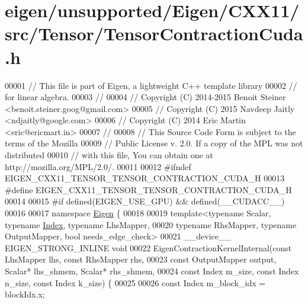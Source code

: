 \hypertarget{eigen_2unsupported_2_eigen_2_c_x_x11_2src_2_tensor_2_tensor_contraction_cuda_8h_source}{}\section{eigen/unsupported/\+Eigen/\+C\+X\+X11/src/\+Tensor/\+Tensor\+Contraction\+Cuda.h}
\label{eigen_2unsupported_2_eigen_2_c_x_x11_2src_2_tensor_2_tensor_contraction_cuda_8h_source}

\begin{DoxyCode}
00001 \textcolor{comment}{// This file is part of Eigen, a lightweight C++ template library}
00002 \textcolor{comment}{// for linear algebra.}
00003 \textcolor{comment}{//}
00004 \textcolor{comment}{// Copyright (C) 2014-2015 Benoit Steiner <benoit.steiner.goog@gmail.com>}
00005 \textcolor{comment}{// Copyright (C) 2015 Navdeep Jaitly <ndjaitly@google.com>}
00006 \textcolor{comment}{// Copyright (C) 2014 Eric Martin <eric@ericmart.in>}
00007 \textcolor{comment}{//}
00008 \textcolor{comment}{// This Source Code Form is subject to the terms of the Mozilla}
00009 \textcolor{comment}{// Public License v. 2.0. If a copy of the MPL was not distributed}
00010 \textcolor{comment}{// with this file, You can obtain one at http://mozilla.org/MPL/2.0/.}
00011 
00012 \textcolor{preprocessor}{#ifndef EIGEN\_CXX11\_TENSOR\_TENSOR\_CONTRACTION\_CUDA\_H}
00013 \textcolor{preprocessor}{#define EIGEN\_CXX11\_TENSOR\_TENSOR\_CONTRACTION\_CUDA\_H}
00014 
00015 \textcolor{preprocessor}{#if defined(EIGEN\_USE\_GPU) && defined(\_\_CUDACC\_\_)}
00016 
00017 \textcolor{keyword}{namespace }\hyperlink{namespace_eigen}{Eigen} \{
00018 
00019 \textcolor{keyword}{template}<\textcolor{keyword}{typename} Scalar, \textcolor{keyword}{typename} \hyperlink{namespace_eigen_a62e77e0933482dafde8fe197d9a2cfde}{Index}, \textcolor{keyword}{typename} LhsMapper,
00020          \textcolor{keyword}{typename} RhsMapper, \textcolor{keyword}{typename} OutputMapper, \textcolor{keywordtype}{bool} needs\_edge\_check>
00021 \_\_device\_\_ EIGEN\_STRONG\_INLINE \textcolor{keywordtype}{void}
00022 EigenContractionKernelInternal(\textcolor{keyword}{const} LhsMapper lhs, \textcolor{keyword}{const} RhsMapper rhs,
00023                                \textcolor{keyword}{const} OutputMapper output, Scalar* lhs\_shmem, Scalar* rhs\_shmem,
00024                        \textcolor{keyword}{const} Index m\_size, \textcolor{keyword}{const} Index n\_size, \textcolor{keyword}{const} Index k\_size) \{
00025 
00026   \textcolor{keyword}{const} Index m\_block\_idx = blockIdx.x;

\end{DoxyCode}

